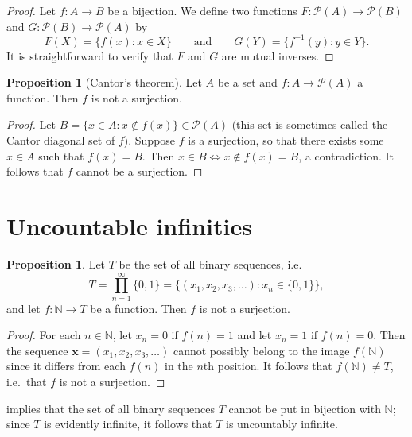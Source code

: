 \documentclass[12pt]{article}
\theoremstyle{definition}
\newtheorem{proposition}[definition]{Proposition}
\begin{document}
\begin{proof}
    Let \( f : A \to B \) be a bijection. We define two functions \( F : \mathscr{P}(A) \to \mathscr{P}(B) \) and \( G : \mathscr{P}(B) \to \mathscr{P}(A) \) by
    \[
        F(X) = \{ f(x) : x \in X \} \qquad \text{and} \qquad G(Y) = \{ f^{-1}(y) : y \in Y \}.
    \]
    It is straightforward to verify that \( F \) and \( G \) are mutual inverses.
\end{proof}

\begin{proposition}[Cantor's theorem]
\label{prop:no_surjection_from_set_to_power_set}
    Let \( A \) be a set and \( f : A \to \mathscr{P}(A) \) a function. Then \( f \) is not a surjection.
\end{proposition}

\begin{proof}
    Let \( B = \{ x \in A : x \not\in f(x) \} \in \mathscr{P}(A) \) (this set is sometimes called the Cantor diagonal set of \( f \)). Suppose \( f \) is a surjection, so that there exists some \( x \in A \) such that \( f(x) = B \). Then \( x \in B \iff x \not\in f(x) = B \), a contradiction. It follows that \( f \) cannot be a surjection.
\end{proof}

\section{Uncountable infinities}
\label{sec:uncountable_infinities}

\begin{proposition}
\label{prop:no_surjection_from_N_to_set_of_binary_sequences}
    Let \( T \) be the set of all binary sequences, i.e.\
    \[
        T = \prod_{n=1}^{\infty} \{ 0, 1 \} = \{ (x_1, x_2, x_3, \ldots) : x_n \in \{ 0, 1 \} \},
    \]
    and let \( f : \mathbb{N} \to T \) be a function. Then \( f \) is not a surjection.
\end{proposition}

\begin{proof}
    For each \( n \in \mathbb{N} \), let \( x_n = 0 \) if \( f(n) = 1 \) and let \( x_n = 1 \) if \( f(n) = 0 \). Then the sequence \( \bm{x} = (x_1, x_2, x_3, \ldots) \) cannot possibly belong to the image \( f(\mathbb{N}) \) since it differs from each \( f(n) \) in the \( n \)th position. It follows that \( f(\mathbb{N}) \neq T \), i.e.\ that \( f \) is not a surjection.
\end{proof}

 implies that the set of all binary sequences \( T \) cannot be put in bijection with \( \mathbb{N} \); since \( T \) is evidently infinite, it follows that \( T \) is uncountably infinite.
\end{document}
